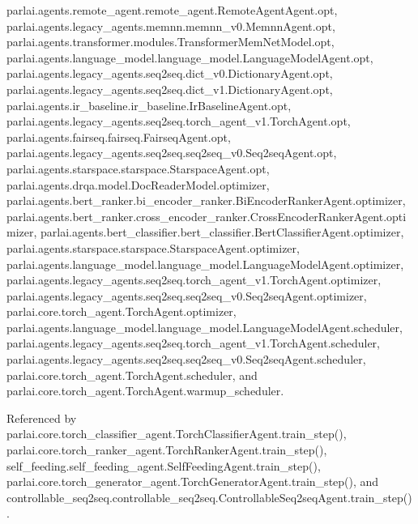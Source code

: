 parlai.\+agents.\+remote\+\_\+agent.\+remote\+\_\+agent.\+Remote\+Agent\+Agent.\+opt, parlai.\+agents.\+legacy\+\_\+agents.\+memnn.\+memnn\+\_\+v0.\+Memnn\+Agent.\+opt, parlai.\+agents.\+transformer.\+modules.\+Transformer\+Mem\+Net\+Model.\+opt, parlai.\+agents.\+language\+\_\+model.\+language\+\_\+model.\+Language\+Model\+Agent.\+opt, parlai.\+agents.\+legacy\+\_\+agents.\+seq2seq.\+dict\+\_\+v0.\+Dictionary\+Agent.\+opt, parlai.\+agents.\+legacy\+\_\+agents.\+seq2seq.\+dict\+\_\+v1.\+Dictionary\+Agent.\+opt, parlai.\+agents.\+ir\+\_\+baseline.\+ir\+\_\+baseline.\+Ir\+Baseline\+Agent.\+opt, parlai.\+agents.\+legacy\+\_\+agents.\+seq2seq.\+torch\+\_\+agent\+\_\+v1.\+Torch\+Agent.\+opt, parlai.\+agents.\+fairseq.\+fairseq.\+Fairseq\+Agent.\+opt, parlai.\+agents.\+legacy\+\_\+agents.\+seq2seq.\+seq2seq\+\_\+v0.\+Seq2seq\+Agent.\+opt, parlai.\+agents.\+starspace.\+starspace.\+Starspace\+Agent.\+opt, parlai.\+agents.\+drqa.\+model.\+Doc\+Reader\+Model.\+optimizer, parlai.\+agents.\+bert\+\_\+ranker.\+bi\+\_\+encoder\+\_\+ranker.\+Bi\+Encoder\+Ranker\+Agent.\+optimizer, parlai.\+agents.\+bert\+\_\+ranker.\+cross\+\_\+encoder\+\_\+ranker.\+Cross\+Encoder\+Ranker\+Agent.\+optimizer, parlai.\+agents.\+bert\+\_\+classifier.\+bert\+\_\+classifier.\+Bert\+Classifier\+Agent.\+optimizer, parlai.\+agents.\+starspace.\+starspace.\+Starspace\+Agent.\+optimizer, parlai.\+agents.\+language\+\_\+model.\+language\+\_\+model.\+Language\+Model\+Agent.\+optimizer, parlai.\+agents.\+legacy\+\_\+agents.\+seq2seq.\+torch\+\_\+agent\+\_\+v1.\+Torch\+Agent.\+optimizer, parlai.\+agents.\+legacy\+\_\+agents.\+seq2seq.\+seq2seq\+\_\+v0.\+Seq2seq\+Agent.\+optimizer, parlai.\+core.\+torch\+\_\+agent.\+Torch\+Agent.\+optimizer, parlai.\+agents.\+language\+\_\+model.\+language\+\_\+model.\+Language\+Model\+Agent.\+scheduler, parlai.\+agents.\+legacy\+\_\+agents.\+seq2seq.\+torch\+\_\+agent\+\_\+v1.\+Torch\+Agent.\+scheduler, parlai.\+agents.\+legacy\+\_\+agents.\+seq2seq.\+seq2seq\+\_\+v0.\+Seq2seq\+Agent.\+scheduler, parlai.\+core.\+torch\+\_\+agent.\+Torch\+Agent.\+scheduler, and parlai.\+core.\+torch\+\_\+agent.\+Torch\+Agent.\+warmup\+\_\+scheduler.



Referenced by parlai.\+core.\+torch\+\_\+classifier\+\_\+agent.\+Torch\+Classifier\+Agent.\+train\+\_\+step(), parlai.\+core.\+torch\+\_\+ranker\+\_\+agent.\+Torch\+Ranker\+Agent.\+train\+\_\+step(), self\+\_\+feeding.\+self\+\_\+feeding\+\_\+agent.\+Self\+Feeding\+Agent.\+train\+\_\+step(), parlai.\+core.\+torch\+\_\+generator\+\_\+agent.\+Torch\+Generator\+Agent.\+train\+\_\+step(), and controllable\+\_\+seq2seq.\+controllable\+\_\+seq2seq.\+Controllable\+Seq2seq\+Agent.\+train\+\_\+step().

